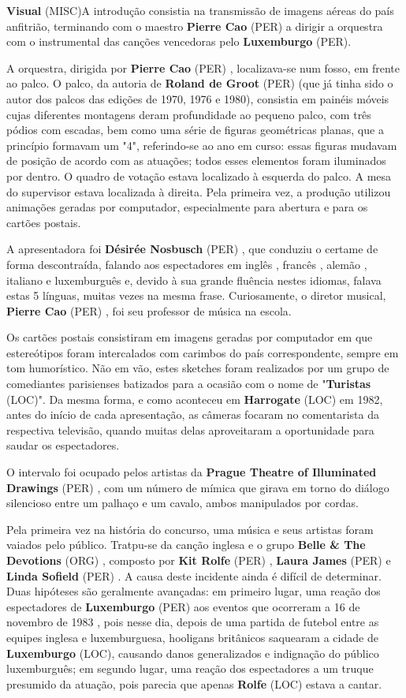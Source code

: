 \documentclass[12pt,a4paper]{article}
\begin{document}
\textbf{Visual} (MISC)A introdução consistia na transmissão de imagens aéreas do país anfitrião, terminando com o maestro \textbf{Pierre Cao} (PER) a dirigir a orquestra com o instrumental das canções vencedoras pelo \textbf{Luxemburgo} (PER).

A orquestra, dirigida por \textbf{Pierre Cao} (PER) , localizava-se num fosso, em frente ao palco. O palco, da autoria de \textbf{Roland de Groot} (PER) (que já tinha sido o autor dos palcos das edições de 1970, 1976 e 1980), consistia em painéis móveis cujas diferentes montagens deram profundidade ao pequeno palco, com três pódios com escadas, bem como uma série de figuras geométricas planas, que a princípio formavam um "4", referindo-se ao ano em curso: essas figuras mudavam de posição de acordo com as atuações; todos esses elementos foram iluminados por dentro. O quadro de votação estava localizado à esquerda do palco. A mesa do supervisor estava localizada à direita. Pela primeira vez, a produção utilizou animações geradas por computador, especialmente para abertura e para os cartões postais.

A apresentadora foi \textbf{Désirée Nosbusch} (PER) , que conduziu o certame de forma descontraída, falando aos espectadores em inglês , francês , alemão , italiano e luxemburguês e, devido à sua grande fluência nestes idiomas, falava estas 5 línguas, muitas vezes na mesma frase. Curiosamente, o diretor musical, \textbf{Pierre Cao} (PER) , foi seu professor de música na escola.

Os cartões postais consistiram em imagens geradas por computador em que estereótipos foram intercalados com carimbos do país correspondente, sempre em tom humorístico. Não em vão, estes sketches foram realizados por um grupo de comediantes parisienses batizados para a ocasião com o nome de "\textbf{Turistas} (LOC)". Da mesma forma, e como aconteceu em \textbf{Harrogate} (LOC) em 1982, antes do início de cada apresentação, as câmeras focaram no comentarista da respectiva televisão, quando muitas delas aproveitaram a oportunidade para saudar os espectadores.

O intervalo foi ocupado pelos artistas da \textbf{Prague Theatre of Illuminated Drawings} (PER) , com um número de mímica que girava em torno do diálogo silencioso entre um palhaço e um cavalo, ambos manipulados por cordas.

Pela primeira vez na história do concurso, uma música e seus artistas foram vaiados pelo público. Tratpu-se da canção inglesa e o grupo \textbf{Belle \& The Devotions} (ORG) , composto por \textbf{Kit Rolfe} (PER) , \textbf{Laura James} (PER) e \textbf{Linda Sofield} (PER) . A causa deste incidente ainda é difícil de determinar. Duas hipóteses são geralmente avançadas: em primeiro lugar, uma reação dos espectadores de \textbf{Luxemburgo} (PER) aos eventos que ocorreram a 16 de novembro de 1983 , pois nesse dia, depois de uma partida de futebol entre as equipes inglesa e luxemburguesa, hooligans britânicos saquearam a cidade de \textbf{Luxemburgo} (LOC), causando danos generalizados e indignação do público luxemburguês; em segundo lugar, uma reação dos espectadores a um truque presumido da atuação, pois parecia que apenas \textbf{Rolfe} (LOC) estava a cantar.
\end{document}
